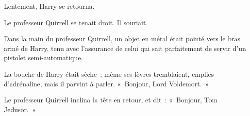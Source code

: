 Lentement, Harry se retourna.

Le professeur Quirrell se tenait droit. Il souriait.

Dans la main du professeur Quirrell, un objet en métal était pointé vers le bras armé de Harry, tenu avec l'assurance de celui qui sait parfaitement de servir d'un pistolet semi-automatique.

La bouche de Harry était sèche~; même ses lèvres tremblaient, emplies d'adrénaline, mais il parvint à parler. «~Bonjour, Lord Voldemort.~»

Le professeur Quirrell inclina la tête en retour, et dit~: «~Bonjour, Tom Jedusor.~»
